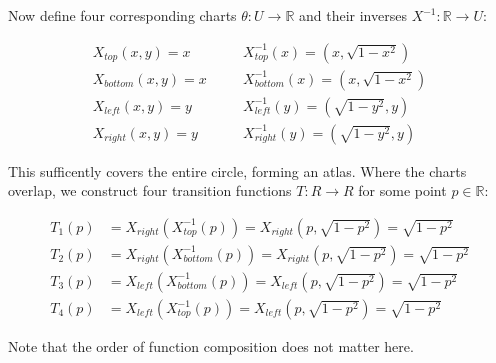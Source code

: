 \documentclass{article}
\begin{document}
        Now define four corresponding charts $\theta: U \rightarrow \mathbb{R}$ and their inverses $X^{-1}: \mathbb{R}\rightarrow U$:

        \begin{align*}
            X_{top}(x,y) = x & \quad & X_{top}^{-1}(x) = (x, \sqrt{1 - x^2}) \\
            X_{bottom}(x,y) = x & \quad & X_{bottom}^{-1}(x) = (x, \sqrt{1 - x^2}) \\
            X_{left}(x,y) = y & \quad & X_{left}^{-1}(y) = (\sqrt{1 - y^2}, y) \\
            X_{right}(x,y) = y & \quad & X_{right}^{-1}(y) = (\sqrt{1 - y^2}, y)
        \end{align*}

        This sufficently covers the entire circle, forming an atlas. Where the charts overlap, we construct four transition functions $T: R \rightarrow R$ for some point $p \in \mathbb{R}$:

        \begin{align*}
            T_1(p) &= X_{right} (X_{top}^{-1}(p)) = X_{right} (p, \sqrt{1 - p^2}) =  \sqrt{1 - p^2} \\
            T_2(p) &= X_{right} (X_{bottom}^{-1}(p)) = X_{right} (p, \sqrt{1 - p^2}) =  \sqrt{1 - p^2} \\
            T_3(p) &= X_{left} (X_{bottom}^{-1}(p)) = X_{left}(p, \sqrt{1 - p^2}) = \sqrt{1 - p^2} \\
            T_4(p) &= X_{left} (X_{top}^{-1}(p)) = X_{left}(p, \sqrt{1 - p^2}) = \sqrt{1 - p^2}
        \end{align*}

        Note that the order of function composition does not matter here.
\end{document}
